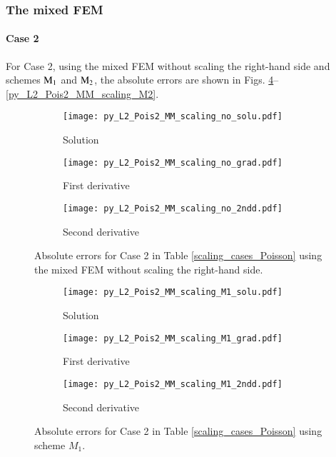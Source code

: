 \documentclass[review,3p]{elsarticle}
\begin{document}
\newpage

\subsubsection{The mixed FEM}

\paragraph{Case 2}
For Case 2, using the mixed FEM without scaling the right-hand side and schemes ${\rm M}_1$ and ${\rm M}_2$, the absolute errors are shown in Figs. \ref{py_L2_Pois2_MM_scaling_no}--\ref{py_L2_Pois2_MM_scaling_M2}.

\begin{figure}[!ht]
    \begin{subfigure}{5.5cm}
        \texttt{[image: py\_L2\_Pois2\_MM\_scaling\_no\_solu.pdf]}
        \caption{Solution}
        \label{py_L2_Pois2_MM_scaling_no_solu}
    \end{subfigure}
    \hspace{-0.2cm}
    \begin{subfigure}{5.5cm}
        \texttt{[image: py\_L2\_Pois2\_MM\_scaling\_no\_grad.pdf]}
        \caption{First derivative}
        \label{py_L2_Pois2_MM_scaling_no_grad}
    \end{subfigure}
    \hspace{-0.2cm}
    \begin{subfigure}{5.5cm}
        \texttt{[image: py\_L2\_Pois2\_MM\_scaling\_no\_2ndd.pdf]}
        \caption{Second derivative}
        \label{py_L2_Pois2_MM_scaling_no_2ndd}
    \end{subfigure}
\caption{Absolute errors for Case 2 in Table \ref{scaling_cases_Poisson} using the mixed FEM without scaling the right-hand side.}
\label{py_L2_Pois2_MM_scaling_no}
\end{figure}

\begin{figure}[!ht]
    \begin{subfigure}{5.5cm}
        \texttt{[image: py\_L2\_Pois2\_MM\_scaling\_M1\_solu.pdf]}
        \caption{Solution}
        \label{py_L2_Pois2_MM_scaling_M1_solu}
    \end{subfigure}
    \hspace{-0.2cm}
    \begin{subfigure}{5.5cm}
        \texttt{[image: py\_L2\_Pois2\_MM\_scaling\_M1\_grad.pdf]}
        \caption{First derivative}
        \label{py_L2_Pois2_MM_scaling_M1_grad}
    \end{subfigure}
    \hspace{-0.2cm}
    \begin{subfigure}{5.5cm}
        \texttt{[image: py\_L2\_Pois2\_MM\_scaling\_M1\_2ndd.pdf]}
        \caption{Second derivative}
        \label{py_L2_Pois2_MM_scaling_M1_2ndd}
    \end{subfigure}
\caption{Absolute errors for Case 2 in Table \ref{scaling_cases_Poisson} using scheme $M_1$.}
\label{py_L2_Pois2_MM_scaling_M1}
\end{figure}
\end{document}
